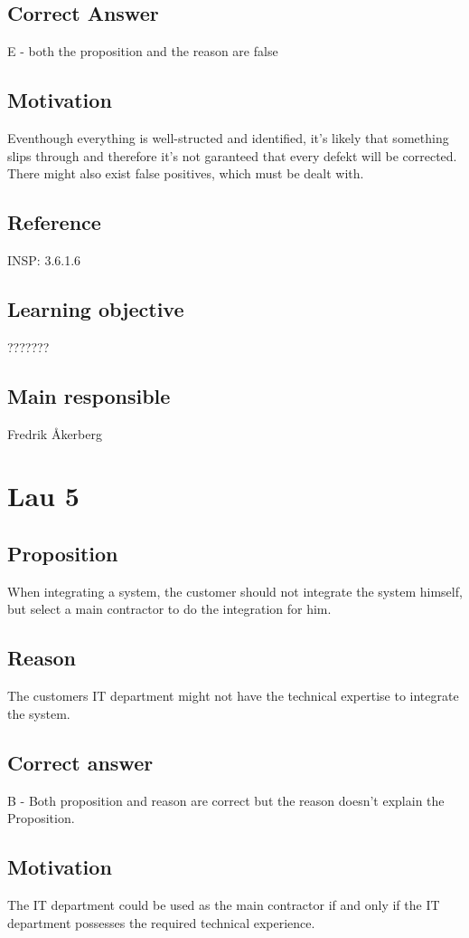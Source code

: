 \documentclass[a4paper]{article}
\begin{document}
\subsection*{Correct Answer}
E - both the proposition and the reason are false
\subsection*{Motivation}
Eventhough everything is well-structed and identified, it's likely that something slips through and therefore it's not garanteed that every defekt will be corrected.
There might also exist false positives, which must be dealt with.
\subsection*{Reference}
INSP: 3.6.1.6
\subsection*{Learning objective}
???????
\subsection*{Main responsible}
Fredrik Åkerberg

\section{Lau 5}
	\subsection{Proposition}
		When integrating a system, the customer should not integrate the system himself, but select a main contractor to do the integration for him.
	\subsection{Reason}
		The customers IT department might not have the technical expertise to integrate the system.
	\subsection{Correct answer}
		B - Both proposition and reason are correct but the reason doesn't explain the Proposition.
	\subsection{Motivation}
		The IT department could be used as the main contractor if and only if the IT department possesses the required technical experience.
\end{document}
